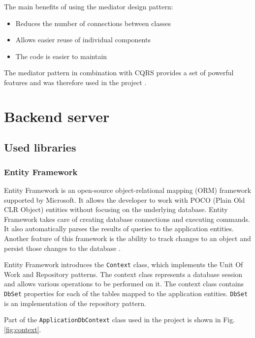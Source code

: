 \documentclass[a4paper,twoside,12pt]{book}
\begin{document}
The main benefits of using the mediator design pattern: 
\begin{itemize}
\item Reduces the number of connections between classes
\item Allows easier reuse of individual components
\item The code is easier to maintain
\end{itemize}

The mediator pattern in combination with CQRS provides a set of powerful features and was therefore used in the project \cite{bib:mediatorCQRS}.

\section{Backend server}

\subsection{Used libraries}

\subsubsection{Entity Framework}
Entity Framework is an open-source object-relational mapping (ORM) framework supported by Microsoft. It allows the developer to work with POCO (Plain Old CLR Object) entities without focusing on the underlying database. Entity Framework takes care of creating database connections and executing commands. It also automatically parses the results of queries to the application entities. Another feature of this framework is the ability to track changes to an object and persist those changes to the database \cite{bib:ef}. 

Entity Framework introduces the \lstinline|Context| class, which implements the Unit Of Work and Repository patterns. The context class represents a database session and allows various operations to be performed on it. The context class contains \lstinline|DbSet| properties for each of the tables mapped to the application entities. \lstinline|DbSet| is an implementation of the repository pattern\cite{bib:efRepository}.  

Part of the \lstinline|ApplicationDbContext| class used in the project is shown in Fig. \ref{fig:context}.
     
\end{document}
